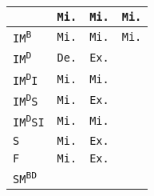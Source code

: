 \begin{tabular}{|l||c|c|c|}
 & \cellcolor{olive!80}\texttt{Mi.}
 & \cellcolor{olive!80}\texttt{Mi.}
 & \cellcolor{olive!80}\texttt{Mi.}
 \\
 \hline

 \texttt{IM\textsuperscript{B}}

 & \cellcolor{olive!80}\texttt{Mi.}
 & \cellcolor{olive!80}\texttt{Mi.}
 & \cellcolor{olive!80}\texttt{Mi.}
 \\
 \hline

 \texttt{IM\textsuperscript{D}}

 & \cellcolor{blue!40}\texttt{De.}
 & \cellcolor{orange!60}\texttt{Ex.}
 & \cellcolor{black!40}
 \\
 \hline

 \texttt{IM\textsuperscript{D}I}

 & \cellcolor{olive!80}\texttt{Mi.}
 & \cellcolor{olive!80}\texttt{Mi.}
 & \cellcolor{black!40}
 \\
 \hline

 \texttt{IM\textsuperscript{D}S}

 & \cellcolor{olive!80}\texttt{Mi.}
 & \cellcolor{orange!60}\texttt{Ex.}
 & \cellcolor{black!40}
 \\
 \hline

 \texttt{IM\textsuperscript{D}SI}

 & \cellcolor{olive!80}\texttt{Mi.}
 & \cellcolor{olive!80}\texttt{Mi.}
 & \cellcolor{black!40}
 \\
 \hline

 \texttt{S}

 & \cellcolor{olive!80}\texttt{Mi.}
 & \cellcolor{orange!60}\texttt{Ex.}
 & \cellcolor{black!40}
 \\
 \hline

 \texttt{F}

 & \cellcolor{olive!80}\texttt{Mi.}
 & \cellcolor{orange!60}\texttt{Ex.}
 & \cellcolor{black!40}
 \\
 \hline

 \texttt{SM\textsuperscript{BD}}


\end{tabular}
